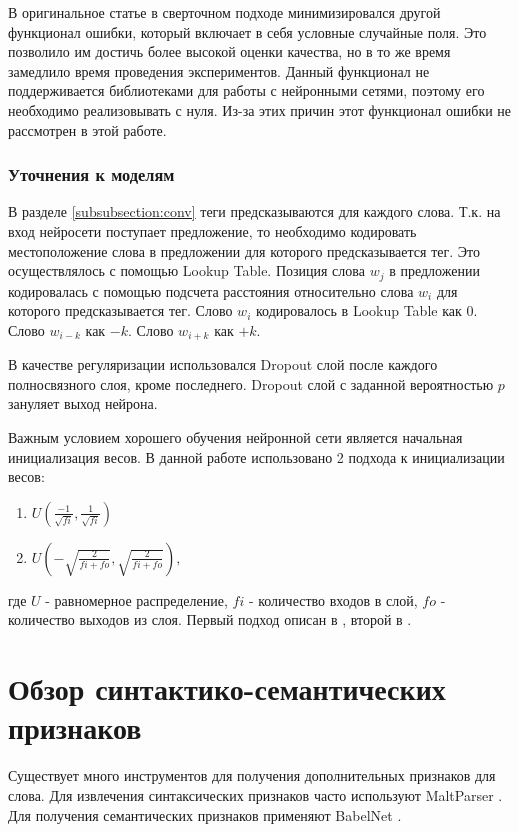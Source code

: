   В оригинальное статье \citep{collobert2011natural} в сверточном подходе
  минимизировался другой функционал ошибки, который включает в себя условные случайные поля.
  Это позволило им достичь более высокой оценки качества, но в то же время замедлило
  время проведения экспериментов. Данный функционал не поддерживается библиотеками для
  работы с нейронными сетями, поэтому его необходимо реализовывать с нуля.
  Из-за этих причин этот функционал ошибки не рассмотрен в этой работе.

  \subsubsection{Уточнения к моделям}

  В разделе \ref{subsubsection:conv} теги предсказываются для каждого слова.
  Т.к. на вход нейросети поступает предложение, то необходимо кодировать
  местоположение слова в предложении для которого предсказывается тег.
  Это осуществлялось с помощью Lookup Table.
  Позиция слова $w_j$ в предложении кодировалась
  с помощью подсчета расстояния относительно слова $w_i$ для которого предсказывается тег.
  Слово $w_i$ кодировалось в Lookup Table как $0$. Слово $w_{i-k}$ как $-k$. Слово $w_{i+k}$ как $+k$.

  В качестве регуляризации использовался Dropout слой после каждого полносвязного слоя,
  кроме последнего.
  Dropout слой \citep{srivastava2014dropout} с заданной вероятностью $p$ зануляет
  выход нейрона.

  Важным условием хорошего обучения нейронной сети является начальная инициализация
  весов. В данной работе использовано 2 подхода к инициализации весов:
  \begin{enumerate}
  \item $U(\frac{-1}{\sqrt{fi}}, \frac{1}{\sqrt{fi}})$
  \item $U(-\sqrt{\frac{2}{fi + fo}}, \sqrt{\frac{2}{fi + fo}}),$
  \end{enumerate}
  где $U$ - равномерное распределение, $fi$ - количество входов в слой,
  $fo$ - количество выходов из слоя.
  Первый подход описан в \citep{collobert2011natural}, второй в \citep{glorot2010understanding}.


  \section{Обзор синтактико-семантических признаков}
    Существует много инструментов для получения дополнительных признаков для слова.
    Для извлечения синтаксических признаков часто используют MaltParser \citep{nivre2006maltparser}.
    Для получения семантических признаков применяют BabelNet \citep{navigli2010babelnet}.

